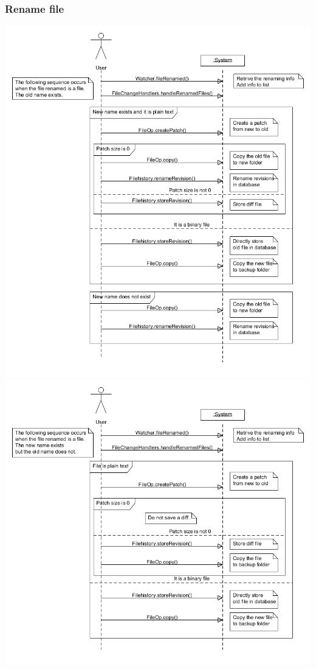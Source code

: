 \documentclass[12pt,a4paper]{article}
\begin{document}
\subsubsection{Rename file}
\includegraphics[width=\linewidth]{images/fileRenamed_file_ssd.png}
\newpage
\includegraphics[width=\linewidth]{images/fileRenamed_file2_ssd.png}
\end{document}
